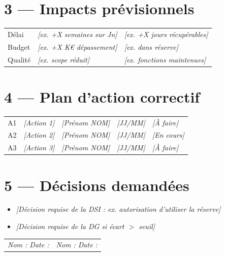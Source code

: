 \documentclass[11pt,a4paper,oneside]{report}
\begin{document}
\section*{3 — Impacts prévisionnels}

\renewcommand{\arraystretch}{1.3}
\begin{tabularx}{\textwidth}{L{3cm} Y Y}
\toprule
{} &  &  \\
\midrule
Délai   & \textit{[ex. +X semaines sur Jn]} & \textit{[ex. +X jours récupérables]} \\
Budget  & \textit{[ex. +X K€ dépassement]} & \textit{[ex. dans réserve]} \\
Qualité & \textit{[ex. scope réduit]}       & \textit{[ex. fonctions maintenues]} \\
\bottomrule
\end{tabularx}

\section*{4 — Plan d'action correctif}

\renewcommand{\arraystretch}{1.3}
\begin{tabularx}{\textwidth}{C{0.6cm} Y L{3.5cm} C{2.5cm} C{2cm}}
\toprule
{}\th{\#} &  &  &  &  \\
\midrule
A1 & \textit{[Action 1]} & \textit{[Prénom NOM]} & \textit{[JJ/MM]} & \textit{[À faire]} \\
A2 & \textit{[Action 2]} & \textit{[Prénom NOM]} & \textit{[JJ/MM]} & \textit{[En cours]} \\
A3 & \textit{[Action 3]} & \textit{[Prénom NOM]} & \textit{[JJ/MM]} & \textit{[À faire]} \\
\bottomrule
\end{tabularx}

\section*{5 — Décisions demandées}

\begin{itemize}
  \item \textit{[Décision requise de la DSI : ex. autorisation d'utiliser la réserve]}
  \item \textit{[Décision requise de la DG si écart $>$ seuil]}
\end{itemize}

\vspace{8pt}
\renewcommand{\arraystretch}{2}
\begin{tabularx}{\textwidth}{Y Y}
\toprule
{} &  \\
\midrule
\textit{Nom : \hfill Date :} & \textit{Nom : \hfill Date :} \\
\bottomrule
\end{tabularx}
\end{document}
